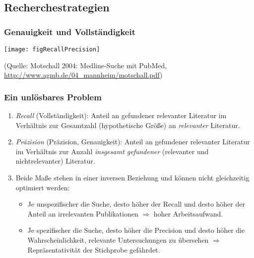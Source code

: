 \subsection{Recherchestrategien}


\begin{frame}[plain]\frametitle{Genauigkeit und Vollständigkeit}
  \begin{center}
    \texttt{[image: figRecallPrecision]}
  \end{center}
  \footnotesize{(Quelle: Motschall 2004: Medline-Suche mit PubMed,
    \url{http://www.agmb.de/04_mannheim/motschall.pdf})}
\end{frame}


\begin{frame}
  \frametitle{Ein unlösbares Problem}
  \begin{enumerate}[<+->]
  \item \emph{Recall} (Vollständigkeit): Anteil an gefundener relevanter
    Literatur im Verhältnis zur Gesamtzahl (hypothetische Größe) an
    \emph{relevanter} Literatur.
  \item \emph{Präzision} (Präzision, Genauigkeit): Anteil an gefundener
    relevanter Literatur im Verhältnis zur Anzahl \emph{insgesamt gefundener}
    (relevanter und nichtrelevanter) Literatur.
  \item Beide Maße stehen in einer inversen Beziehung und können nicht
    gleichzeitig optimiert werden:
    \begin{itemize}
    \item Je unspezifischer die Suche, desto höher der Recall und desto höher
      der Anteil an irrelevanten Publikationen $\Rightarrow$ hoher Arbeitsaufwand.
    \item Je spezifischer die Suche, desto höher die Precision und desto höher
      die Wahrscheinlichkeit, relevante Untersuchungen zu übersehen
      $\Rightarrow$ Repräsentativität der Stichprobe gefährdet.
    \end{itemize}
  \end{enumerate}
\end{frame}




